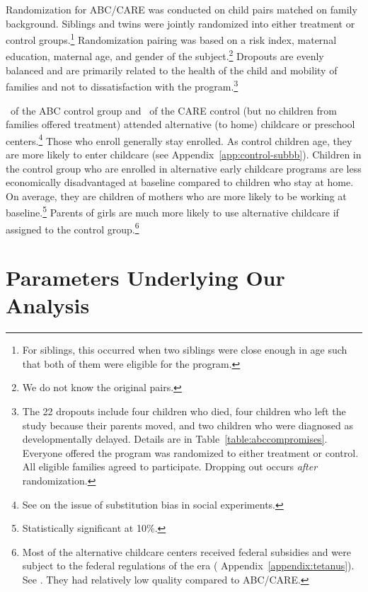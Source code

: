 Randomization for ABC/CARE was conducted on child pairs matched on family background. Siblings and twins were jointly randomized into either treatment or control groups.\footnote{For siblings, this occurred when two siblings were close enough in age such that both of them were eligible for the program.} Randomization pairing was based on a risk index, maternal education, maternal age, and gender of the subject.\footnote{We do not know the original pairs.} Dropouts are evenly balanced and are primarily related to the health of the child and mobility of families and not to dissatisfaction with the program.\footnote{The 22 dropouts include four children who died, four children who left the study because their parents moved, and two children who were diagnosed as developmentally delayed. Details are in Table~\ref{table:abccompromises}. Everyone offered the program was randomized to either treatment or control. All eligible families agreed to participate. Dropping out occurs \emph{after} randomization.}

\treatsubsabc\ of the ABC control group and \treatsubscarec\ of the CARE control (but no children from families offered treatment) attended alternative (to home) childcare or preschool centers.\footnote{See \cite{Heckman_Hohmann_etal_2000_QJE} on the issue of substitution bias in social experiments.} Those who enroll generally stay enrolled. As control children age, they are more likely to enter childcare (see  Appendix~\ref{app:control-subbb}). Children in the control group who are enrolled in alternative early childcare programs are less economically disadvantaged at baseline compared to children who stay at home. On average, they are children of mothers who are more likely to be working at baseline.\footnote{Statistically significant at 10\%.} Parents of girls are much more likely to use alternative childcare if assigned to the control group.\footnote{Most of the alternative childcare centers received federal subsidies and were subject to the federal regulations of the era ( Appendix~\ref{appendix:tetanus}). See \citet{Department-of-Health_1968_DayCareRequirements,NCGA_1971_House-Bill-100,Ramey-et-al_1977_Intro-to-ABC,Ramey_Campbell_1979_SR,Ramey_McGinness_etal_1982_Abecedarianapproach, Burchinal_Campbell_etal_1997_CD}. They had relatively low quality compared to ABC/CARE.}

\section{Parameters Underlying Our Analysis} \label{section:methodsquestions}

